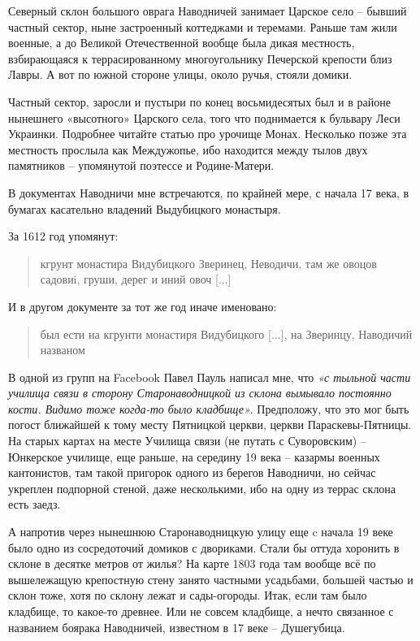 Северный склон большого оврага Наводничей занимает Царское село – бывший частный сектор, ныне застроенный коттеджами и теремами. Раньше там жили военные, а до Великой Отечественной вообще была дикая местность, взбирающаяся к террасированному многоугольнику Печерской крепости близ Лавры. А вот по южной стороне улицы, около ручья, стояли домики.

Частный сектор, заросли и пустыри по конец восьмидесятых был и в районе нынешнего «высотного» Царского села, того что поднимается к бульвару Леси Украинки. Подробнее читайте статью про урочище Монах. Несколько позже эта местность прослыла как Междужопье, ибо находится между тылов двух памятников – упомянутой поэтессе и Родине-Матери.

В документах Наводничи мне встречаются, по крайней мере, с начала 17 века, в бумагах касательно владений Выдубицкого монастыря. 

За 1612 год упомянут:

\begin{quotation}
\noindent кгрунт монастира Видубицкого Зверинец, Неводичи, там же овоцов садовиi, груши, дерег и иний овоч [...]  
\end{quotation}

И в другом документе за тот же год иначе именовано:

\begin{quotation}
\noindent был ести на кгрунти монастиря Видубицкого [...], на Зверинцу, Наводичий названом
\end{quotation}

В одной из групп на Facebook Павел Пауль написал мне, что \textit{«с тыльной части училища связи в сторону Старонаводницкой из склона вымывало постоянно кости. Видимо тоже когда-то было кладбище»}. Предположу, что это мог быть погост ближайшей к тому месту Пятницкой церкви, церкви Параскевы-Пятницы. На старых картах на месте Училища связи (не путать с Суворовским) – Юнкерское училище, еще раньше, на середину 19 века – казармы военных кантонистов, там такой пригорок одного из берегов Наводничи, но сейчас укреплен подпорной стеной, даже несколькими, ибо на одну из террас склона есть заедз.

А напротив через нынешнюю Старонаводницкую улицу еще c начала 19 веке было одно из сосредоточий домиков с двориками. Стали бы оттуда хоронить в склоне в десятке метров от жилья? На карте 1803 года там вообще всё по вышележащую крепостную стену занято частными усадьбами, большей частью и склон тоже, хотя по склону лежат и сады-огороды. Итак, если там было кладбище, то какое-то древнее. Или не совсем кладбище, а нечто связанное с названием боярака Наводничей, известном в 17 веке – Душегубица.


